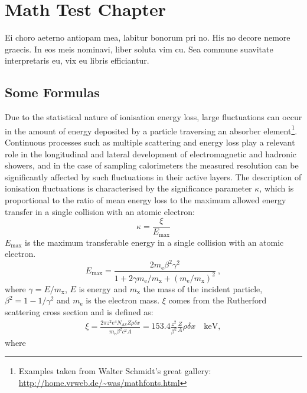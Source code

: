 \chapter{Math Test Chapter}\label{ch:mathtest} %
Ei choro aeterno antiopam mea, labitur bonorum pri no. His no decore
nemore graecis. In eos meis nominavi, liber soluta vim cu. Sea commune
suavitate interpretaris eu, vix eu libris efficiantur.

\section{Some Formulas}
Due to the statistical nature of ionisation energy loss, large
fluctuations can occur in the amount of energy deposited by a particle
traversing an absorber element\footnote{Examples taken from Walter
Schmidt's great gallery: \\
\url{http://home.vrweb.de/~was/mathfonts.html}}.  Continuous processes
such as multiple
scattering and energy loss play a relevant role in the longitudinal
and lateral development of electromagnetic and hadronic
showers, and in the case of sampling calorimeters the
measured resolution can be significantly affected by such fluctuations
in their active layers.  The description of ionisation fluctuations is
characterised by the significance parameter $\kappa$, which is
proportional to the ratio of mean energy loss to the maximum allowed
energy transfer in a single collision with an atomic electron:
\begin{equation}
\kappa =\frac{\xi}{E_{\textrm{max}}} \label{eq:kappa}%
\end{equation}
$E_{\textrm{max}}$ is the maximum transferable energy in a single
collision with an atomic electron.
\[
E_{\textrm{max}} =\frac{2 m_{\textrm{e}} \beta^2\gamma^2 }{1 +
2\gamma m_{\textrm{e}}/m_{\textrm{x}} + \left ( m_{\textrm{e}}
/m_{\textrm{x}}\right)^2}\ ,
\]
where $\gamma = E/m_{\textrm{x}}$, $E$ is energy and
$m_{\textrm{x}}$ the mass of the incident particle,
$\beta^2 = 1 - 1/\gamma^2$ and $m_{\textrm{e}}$ is the electron mass.
$\xi$ comes from the Rutherford scattering cross section
and is defined as:
\begin{eqnarray*} \xi  = \frac{2\pi z^2 e^4 N_{\textrm{Av}} Z \rho
\delta x}{m_{\textrm{e}} \beta^2 c^2 A} =  153.4 \frac{z^2}{\beta^2}
\frac{Z}{A}
  \rho \delta x \quad\textrm{keV},
\end{eqnarray*}
where

